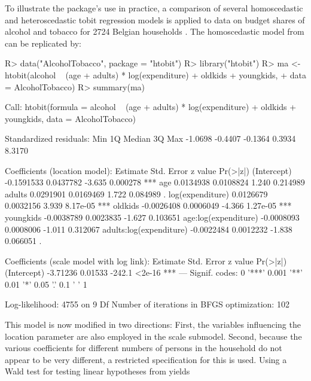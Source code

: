 \documentclass[nojss]{jss}
\begin{document}
To illustrate the package's use in practice, a comparison of several homoscedastic
and heteroscedastic tobit regression models is applied to
data on budget shares of alcohol and tobacco for 2724 Belgian households
\citep[taken from][]{Verbeek:2004}. The homoscedastic model from \cite{Verbeek:2004} can
be replicated by:

\begin{Schunk}
\begin{Sinput}
R> data("AlcoholTobacco", package = "htobit")
R> library("htobit")
R> ma <- htobit(alcohol ~ (age + adults) * log(expenditure) + oldkids + youngkids,
+    data = AlcoholTobacco)
R> summary(ma)
\end{Sinput}
\begin{Soutput}
Call:
htobit(formula = alcohol ~ (age + adults) * log(expenditure) + 
    oldkids + youngkids, data = AlcoholTobacco)

Standardized residuals:
    Min      1Q  Median      3Q     Max 
-1.0698 -0.4407 -0.1364  0.3934  8.3170 

Coefficients (location model):
                          Estimate Std. Error z value Pr(>|z|)    
(Intercept)             -0.1591533  0.0437782  -3.635 0.000278 ***
age                      0.0134938  0.0108824   1.240 0.214989    
adults                   0.0291901  0.0169469   1.722 0.084989 .  
log(expenditure)         0.0126679  0.0032156   3.939 8.17e-05 ***
oldkids                 -0.0026408  0.0006049  -4.366 1.27e-05 ***
youngkids               -0.0038789  0.0023835  -1.627 0.103651    
age:log(expenditure)    -0.0008093  0.0008006  -1.011 0.312067    
adults:log(expenditure) -0.0022484  0.0012232  -1.838 0.066051 .  

Coefficients (scale model with log link):
            Estimate Std. Error z value Pr(>|z|)    
(Intercept) -3.71236    0.01533  -242.1   <2e-16 ***
---
Signif. codes:  0 '***' 0.001 '**' 0.01 '*' 0.05 '.' 0.1 ' ' 1 

Log-likelihood:  4755 on 9 Df
Number of iterations in BFGS optimization: 102 
\end{Soutput}
\end{Schunk}

This model is now modified in two directions: First, the variables influencing the location
parameter are also employed in the scale submodel. Second, because the various coefficients
for different numbers of persons in the household do not appear to be very different,
a restricted specification for this is used. Using a Wald test for testing linear hypotheses
from  \citep{car} yields
\end{document}

